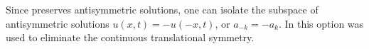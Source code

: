Since \KSe preserves antisymmetric solutions, one can isolate the subspace of 
antisymmetric solutions $u(x,t)=-u(-x,t)$,
or $a_{-k}= - a_k$. In  this option was used to eliminate
the continuous translational symmetry.

